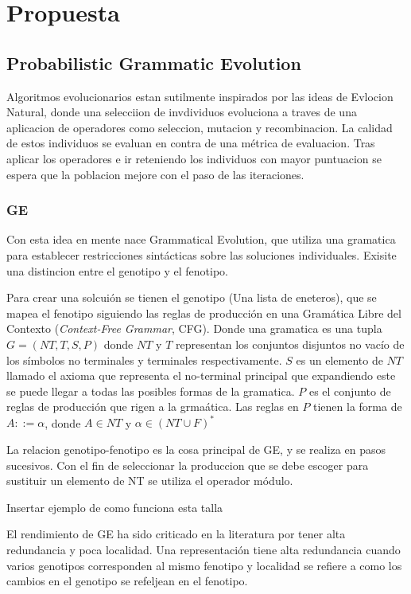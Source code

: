 \chapter{Propuesta}\label{chapter:proposal}

\section{Probabilistic Grammatic Evolution}

Algoritmos evolucionarios estan sutilmente inspirados por las ideas de Evlocion Natural, donde una selecciion de invdividuos evoluciona a traves de una aplicacion de operadores como seleccion, mutacion y recombinacion. La calidad de estos individuos se evaluan en contra de una m\'etrica de evaluacion. Tras aplicar los operadores e ir reteniendo los individuos con mayor puntuacion se espera que la poblacion mejore con el paso de las iteraciones.

\subsection{GE}
Con esta idea en mente nace Grammatical Evolution, que utiliza una gramatica para establecer restricciones sint\'acticas sobre las soluciones individuales. Exisite una distincion entre el genotipo y el fenotipo. 

Para crear una solcui\'on se tienen el genotipo (Una lista de eneteros), que se mapea el fenotipo siguiendo las reglas de producci\'on en una Gram\'atica Libre del Contexto (\textit{Context-Free Grammar}, CFG). Donde una gramatica es una tupla $G = (NT, T, S, P)$ donde $NT$ y $T$ representan los conjuntos disjuntos no vac\'io de los s\'imbolos no terminales y terminales respectivamente. $S$ es un elemento de $NT$ llamado el axioma que representa el no-terminal principal que expandiendo este se puede llegar a todas las posibles formas de la gramatica. $P$ es el conjunto de reglas de producci\'on que rigen a la grma\'atica. Las reglas en $P$ tienen la forma de $A ::= \alpha$, donde $A \in NT$ y  $\alpha \in (NT \cup F)^*$ 

La relacion genotipo-fenotipo es la cosa principal de GE, y se realiza en pasos sucesivos. Con el fin de seleccionar la produccion que se debe escoger para sustituir un elemento de NT se utiliza el operador m\'odulo.

Insertar ejemplo de como funciona esta talla

El rendimiento de GE ha sido criticado en la literatura por tener alta redundancia y poca localidad. Una representaci\'on tiene alta redundancia cuando varios genotipos corresponden al mismo fenotipo y localidad se refiere a como los cambios en el genotipo se refeljean en el fenotipo. 


